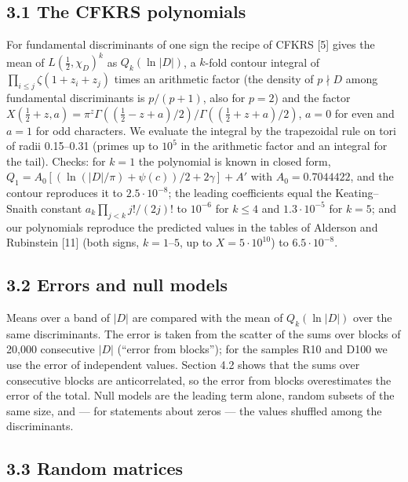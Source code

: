 \documentclass[
  10pt,
]{article}
\begin{document}
\hypertarget{the-cfkrs-polynomials}{%
\subsection{3.1 The CFKRS polynomials}\label{the-cfkrs-polynomials}}

For fundamental discriminants of one sign the recipe of CFKRS {[}5{]}
gives the mean of \(L(\tfrac12, \chi_D)^k\) as \(Q_k(\ln|D|)\), a
\(k\)-fold contour integral of \(\prod_{i \le j}\zeta(1 + z_i + z_j)\)
times an arithmetic factor (the density of \(p \nmid D\) among
fundamental discriminants is \(p/(p+1)\), also for \(p = 2\)) and the
factor
\(X(\tfrac12 + z, a) = \pi^{z}\Gamma((\tfrac12 - z + a)/2)/\Gamma((\tfrac12 + z + a)/2)\),
\(a = 0\) for even and \(a = 1\) for odd characters. We evaluate the
integral by the trapezoidal rule on tori of radii 0.15--0.31 (primes up
to \(10^5\) in the arithmetic factor and an integral for the tail).
Checks: for \(k = 1\) the polynomial is known in closed form,
\(Q_1 = A_0[(\ln(|D|/\pi) + \psi(c))/2 + 2\gamma] + A'\) with
\(A_0 = 0.7044422\), and the contour reproduces it to
\(2.5\cdot10^{-8}\); the leading coefficients equal the Keating--Snaith
constant \(a_k\prod_{j<k} j!/(2j)!\) to \(10^{-6}\) for \(k \le 4\) and
\(1.3\cdot10^{-5}\) for \(k = 5\); and our polynomials reproduce the
predicted values in the tables of Alderson and Rubinstein {[}11{]} (both
signs, \(k = 1\)--\(5\), up to \(X = 5\cdot10^{10}\)) to
\(6.5\cdot10^{-8}\).

\hypertarget{errors-and-null-models}{%
\subsection{3.2 Errors and null models}\label{errors-and-null-models}}

Means over a band of \(|D|\) are compared with the mean of
\(Q_k(\ln|D|)\) over the same discriminants. The error is taken from the
scatter of the sums over blocks of 20,000 consecutive \(|D|\) (``error
from blocks''); for the samples R10 and D100 we use the error of
independent values. Section 4.2 shows that the sums over consecutive
blocks are anticorrelated, so the error from blocks overestimates the
error of the total. Null models are the leading term alone, random
subsets of the same size, and --- for statements about zeros --- the
values shuffled among the discriminants.

\hypertarget{random-matrices}{%
\subsection{3.3 Random matrices}\label{random-matrices}}
\end{document}

